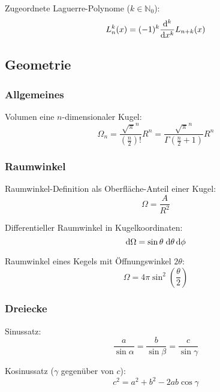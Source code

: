 			\noindent
			Zugeordnete Laguerre-Polynome ($k\in\mathbb{N}_0$):
			\begin{equation}
				L_n^k(x) = (-1)^k\frac{\mathrm{d}^k}{\mathrm{d} x^k} L_{n+k}(x)
			\end{equation}

	\subsection{Geometrie}
		\subsubsection{Allgemeines}
			\noindent
			Volumen eine $n$-dimensionaler Kugel:
			\begin{equation}
				\Omega_n = \frac{\sqrt{\pi}^n}{\left(\frac{n}{2}\right)!}R^n
				= \frac{\sqrt{\pi}^n}{\Gamma\left(\frac{n}{2}+1\right)}R^n
			\end{equation}


		\subsubsection{Raumwinkel}
			\noindent
			Raumwinkel-Definition als Oberfläche-Anteil einer Kugel:
			\begin{equation}
				\Omega = \frac{A}{R^2}
			\end{equation}

			\noindent
			Differentieller Raumwinkel in Kugelkoordinaten:
			\begin{equation}
				\mathrm{d} \Omega = \sin\theta\;\mathrm{d} \theta \,\mathrm{d} \phi
			\end{equation}

			\noindent
			Raumwinkel eines Kegels mit Öffnungswinkel $2\theta$:
			\begin{equation}
				\Omega = 4\pi\sin^2\left(\frac{\theta}{2}\right)
			\end{equation}

		\subsubsection{Dreiecke}
			\noindent
			Sinussatz:
			\begin{equation}
				\frac{a}{\sin\alpha} = \frac{b}{\sin\beta} = \frac{c}{\sin\gamma}
			\end{equation}

			\noindent
			Kosinussatz ($\gamma$ gegenüber von $c$):
			\begin{equation}
				c^2 = a^2 + b^2 -2ab \cos\gamma
			\end{equation}


